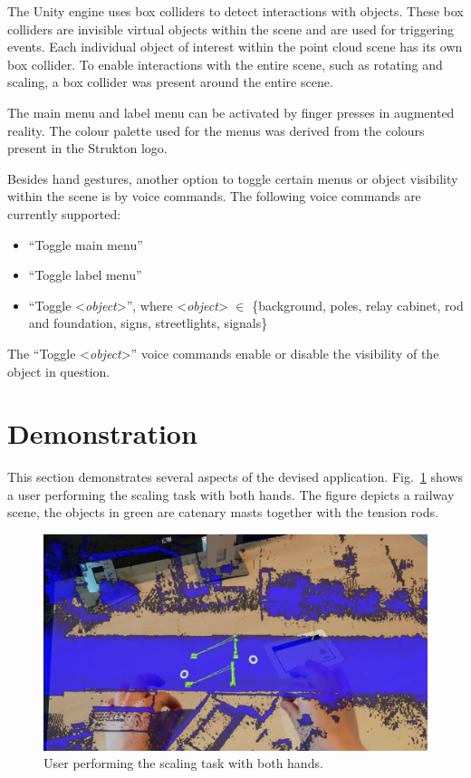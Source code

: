 The Unity engine uses box colliders to detect interactions with objects. These box colliders are invisible virtual objects within the scene and are used for triggering events. Each individual object of interest within the point cloud scene has its own box collider. To enable interactions with the entire scene, such as rotating and scaling, a box collider was present around the entire scene. 

The main menu and label menu can be activated by finger presses in augmented reality. The colour palette used for the menus was derived from the colours present in the Strukton logo.

Besides hand gestures, another option to toggle certain menus or object visibility within the scene is by voice commands. The following voice commands are currently supported:
\begin{itemize}
    \item ``Toggle main menu''
    \item ``Toggle label menu''
    \item ``Toggle \textless{}\textit{object}\textgreater'', where \textless{}\textit{object}\textgreater{} \(\in\) \{background, poles, relay cabinet, rod and foundation, signs, streetlights, signals\}
\end{itemize}
The ``Toggle \textless{}\textit{object}\textgreater'' voice commands enable or disable the visibility of the object in question.

\section{Demonstration}
This section demonstrates several aspects of the devised application. Fig.~\ref{fig:immvis:scale} shows a user performing the scaling task with both hands. The figure depicts a railway scene, the objects in green are catenary masts together with the tension rods.

\begin{figure}[htbp]
    \centering
    \includegraphics[width=0.7\linewidth]{./Chapters/immvis/figs/zoom_interaction.png}
    \caption{User performing the scaling task with both hands.} 
    \label{fig:immvis:scale}
\end{figure}

